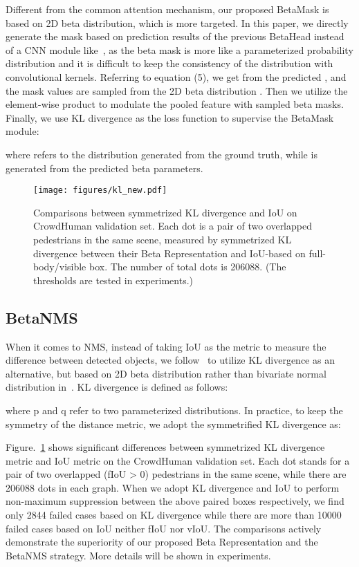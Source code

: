 \documentclass{article}
\begin{document}
Different from the common attention mechanism, our proposed BetaMask is based on 2D beta distribution, which is more targeted. In this paper, we directly generate the mask based on prediction results of the previous BetaHead instead of a CNN module like~\cite{MGAN}, as the beta mask is more like a parameterized probability distribution and it is difficult to keep the consistency of the distribution with convolutional kernels.
Referring to equation (5), we get  from the predicted , and the mask values are sampled from the 2D beta distribution .
Then we utilize the element-wise product to modulate the pooled feature with sampled beta masks. Finally, we use KL divergence as the loss function to supervise the BetaMask module:

where  refers to the distribution generated from the ground truth, while  is generated from the predicted beta parameters.

\begin{figure}
    \centering
    \texttt{[image: figures/kl\_new.pdf]}
    \caption{Comparisons between symmetrized KL divergence and IoU on CrowdHuman validation set. Each dot is a pair of two overlapped pedestrians in the same scene, measured by symmetrized KL divergence between their Beta Representation and IoU-based on full-body/visible box. The number of total dots is 206088. (The thresholds are tested in experiments.)}
    \label{kl}
\end{figure}


\subsection{BetaNMS}
When it comes to NMS, instead of taking IoU as the metric to measure the difference between detected objects, we follow~\cite{Distribution} to utilize KL divergence as an alternative, but based on 2D beta distribution rather than bivariate normal distribution in~\cite{Distribution}.
KL divergence is defined as follows:

where p and q refer to two parameterized distributions. In practice, to keep the symmetry of the distance metric, we adopt the symmetrified KL divergence  as:

Figure.~\ref{kl} shows significant differences between symmetrized KL divergence metric and IoU metric on the CrowdHuman validation set.
Each dot stands for a pair of two overlapped (fIoU >  0) pedestrians in the same scene, while there are 206088 dots in each graph.
When we adopt KL divergence and IoU to perform non-maximum suppression between the above paired boxes respectively, we find only 2844 failed cases based on KL divergence while there are more than 10000 failed cases based on IoU neither fIoU nor vIoU. 
The comparisons actively demonstrate the superiority of our proposed Beta Representation and the BetaNMS strategy. More details will be shown in experiments.
\end{document}
